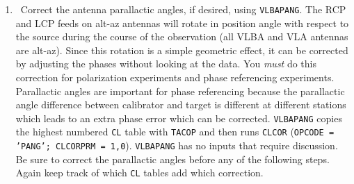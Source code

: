 \begin{enumerate}

\item\ {Correct the antenna parallactic angles, if desired, using
{\tt VLBAPANG}\@.  The RCP and LCP feeds on alt-az antennas will rotate
in position angle with respect to the source during the course of the
observation (all VLBA and VLA antennas are alt-az).  Since this
rotation is a simple geometric effect, it can be corrected by
adjusting the phases without looking at the data.  You {\it must} do
this correction for polarization experiments and phase referencing
experiments. Parallactic angles are important for phase referencing
because the parallactic angle difference between calibrator and target is
different at different stations which leads to an extra phase error which
can be corrected.  {\tt VLBAPANG} copies the highest numbered {\tt CL}
table with {\tt TACOP} and then runs {\tt CLCOR} ({\tt OPCODE = 'PANG';
CLCORPRM = 1,0}).  {\tt VLBAPANG} has no inputs that require
discussion.  Be sure to correct the parallactic angles before any of
the following steps.  Again keep track of which {\tt CL} tables add
which correction.}


\end{enumerate}
